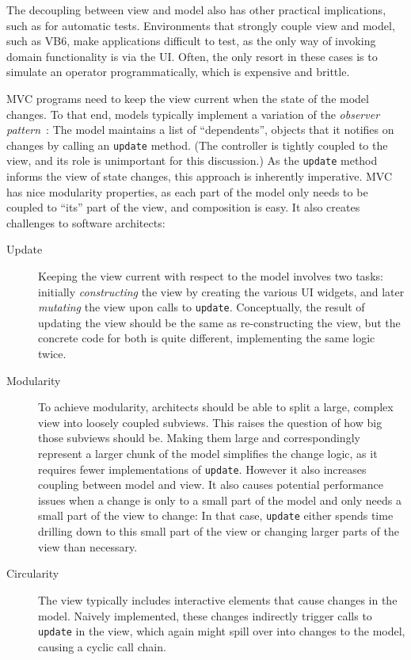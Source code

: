 \documentclass[sigplan,screen]{acmart}
\begin{document}
The decoupling between view and model also has other practical
implications, such as for automatic tests.  Environments that
strongly couple view and model, such as VB6, make applications
difficult to test, as the only way of invoking domain
functionality is via the UI.
Often, the only resort in these cases is to simulate an operator
programmatically, which is expensive and brittle.

MVC programs need to keep the view current when the state of the model
changes.  To that end, models typically implement a variation of the
\textit{observer pattern}~\cite{GoF}: The model maintains a list of
``dependents'', objects that it notifies on changes by calling
an \texttt{update} method.  (The controller is tightly coupled to the
view, and its role is unimportant for this discussion.)
As the \texttt{update} method informs the view of state changes, this
approach is inherently imperative.  MVC has nice modularity
properties, as each part of the model only needs to be coupled to
``its'' part of the view, and composition is easy.
It also creates challenges to
software architects:
\label{sec:challenges}
%
\begin{description}
\item[\hypertarget{challenge:update}{Update}] Keeping the view current with respect to the model involves two
  tasks: initially \emph{constructing} the view by creating the
  various UI widgets, and later \emph{mutating} the view upon calls to
  \texttt{update}.  Conceptually, the result of updating the view
  should be the same as re-constructing the view, but the concrete
  code for both is quite different, implementing the same logic twice.
\item[\hypertarget{challenge:modularity}{Modularity}] To achieve modularity, architects should be able to split a large,
  complex view into loosely coupled subviews.  This raises the
  question of how big those subviews should be. Making them large and
  correspondingly represent a larger chunk of the model
  simplifies the change logic, as it requires fewer implementations of
  \texttt{update}. However it also increases coupling between model
  and view.  It also causes potential performance issues when 
  a change is only to a small part of the model and only needs a
  small part of the view to change: In that case, \texttt{update}
  either spends time drilling down to this small part of the view or
  changing larger parts of the view than necessary.
\item[\hypertarget{challenge:circularity}{Circularity}] The view typically
  includes interactive elements that cause changes in the model.
  Naively implemented, these changes indirectly trigger calls to
  \texttt{update} in the view, which again might spill over into
  changes to the model, causing a cyclic call chain.
\end{description}
\end{document}
